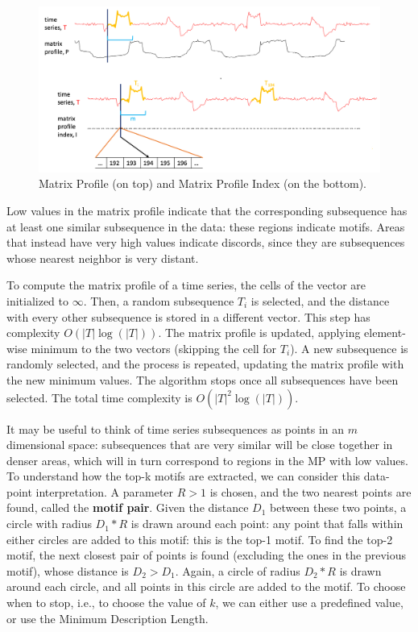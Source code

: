 \begin{figure}[h]
    \centering
    \includegraphics[width=0.9\linewidth]{img/mp_mpi.png}
    \caption{Matrix Profile (on top) and Matrix Profile Index (on the bottom).}
    \label{fig:mp-mpi}
\end{figure}

Low values in the matrix profile indicate that the corresponding subsequence has at least one similar subsequence in the data: these regions indicate motifs. Areas that instead have very high values indicate discords, since they are subsequences whose nearest neighbor is very distant.

To compute the matrix profile of a time series, the cells of the vector are initialized to $\infty$. Then, a random subsequence $T_i$ is selected, and the distance with every other subsequence is stored in a different vector. This step has complexity $O(|T| \log(|T|))$. The matrix profile is updated, applying element-wise minimum to the two vectors (skipping the cell for $T_i$). A new subsequence is randomly selected, and the process is repeated, updating the matrix profile with the new minimum values. The algorithm stops once all subsequences have been selected. The total time complexity is $O(|T|^2 \log(|T|))$.

It may be useful to think of time series subsequences as points in an $m$ dimensional space: subsequences that are very similar will be close together in denser areas, which will in turn correspond to regions in the MP with low values. To understand how the top-k motifs are extracted, we can consider this data-point interpretation. A parameter $R > 1$ is chosen, and the two nearest points are found, called the \textbf{motif pair}. Given the distance $D_1$ between these two points, a circle with radius $D_1 * R$ is drawn around each point: any point that falls within either circles are added to this motif: this is the top-1 motif. To find the top-2 motif, the next closest pair of points is found (excluding the ones in the previous motif), whose distance is $D_2 > D_1$. Again, a circle of radius $D_2 * R$ is drawn around each circle, and all points in this circle are added to the motif. To choose when to stop, i.e., to choose the value of $k$, we can either use a predefined value, or use the Minimum Description Length.

